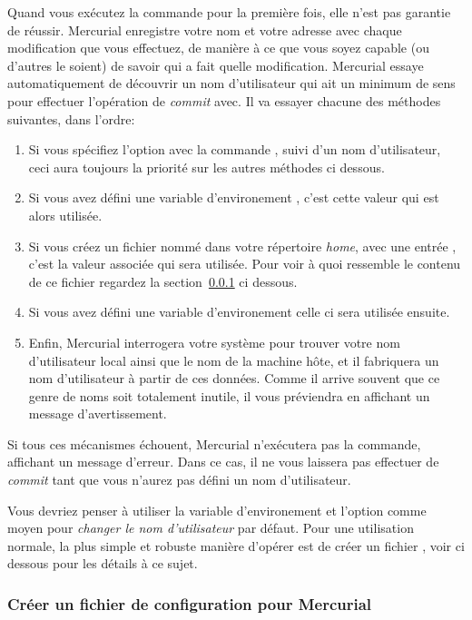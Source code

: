 Quand vous exécutez la commande  pour la première fois, elle
n'est pas garantie de réussir. Mercurial enregistre votre nom et votre 
adresse avec chaque modification que vous effectuez, de manière à ce que
vous soyez capable (ou d'autres le soient) de savoir qui a fait quelle
modification. Mercurial essaye automatiquement de découvrir un nom 
d'utilisateur qui ait un minimum de sens pour effectuer l'opération
de \textit{commit} avec. Il va essayer chacune des méthodes suivantes,
dans l'ordre:
\begin{enumerate}
\item Si vous spécifiez l'option  avec la commande 
  , suivi d'un nom d'utilisateur, ceci aura toujours la 
  priorité sur les autres méthodes ci dessous.
\item Si vous avez défini une variable d'environement , 
  c'est cette valeur qui est alors utilisée.
\item Si vous créez un fichier nommé  dans votre 
   répertoire \textit{home}, avec une entrée , 
   c'est la valeur associée qui sera utilisée. Pour voir à quoi 
   ressemble le contenu de ce fichier regardez la 
   section~\ref{sec:tour-basic:username} ci dessous.
\item Si vous avez défini une variable d'environement 
  celle ci sera utilisée ensuite.
\item Enfin, Mercurial interrogera votre système pour trouver votre
  nom d'utilisateur local ainsi que le nom de la machine hôte, et il 
  fabriquera un nom d'utilisateur à partir de ces données. Comme il arrive
  souvent que ce genre de noms soit totalement inutile, il vous 
  préviendra en affichant un message d'avertissement.
\end{enumerate}

Si tous ces mécanismes échouent, Mercurial n'exécutera pas la commande,
affichant un message d'erreur. Dans ce cas, il ne vous laissera pas 
effectuer de \textit{commit} tant que vous n'aurez pas défini un nom
d'utilisateur.

Vous devriez penser à utiliser la variable d'environement  
et l'option  comme moyen pour \emph{changer le nom
d'utilisateur} par défaut. Pour une utilisation normale, la plus simple
et robuste manière d'opérer est de créer un fichier ,
voir ci dessous pour les détails à ce sujet.

\subsubsection{Créer un fichier de configuration pour Mercurial}
\label{sec:tour-basic:username}

